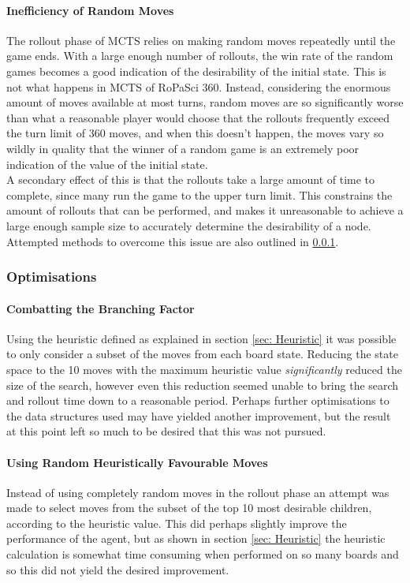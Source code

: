 \documentclass{article}
\begin{document}
\paragraph{Inefficiency of Random Moves}
The rollout phase of MCTS relies on making random moves repeatedly until the game ends. With a large enough number of rollouts, the win rate of the random games becomes a good indication of the desirability of the initial state. This is not what happens in MCTS of RoPaSci 360. Instead, considering the enormous amount of moves available at most turns, random moves are so significantly worse than what a reasonable player would choose that the rollouts frequently exceed the turn limit of 360 moves, and when this doesn't happen, the moves vary so wildly in quality that the winner of a random game is an extremely poor indication of the value of the initial state.\\[2mm]
A secondary effect of this is that the rollouts take a large amount of time to complete, since many run the game to the upper turn limit. This constrains the amount of rollouts that can be performed, and makes it unreasonable to achieve a large enough sample size to accurately determine the desirability of a node. Attempted methods to overcome this issue are also outlined in \ref{sec: MCTS Optimisations}.

\subsubsection{Optimisations}
\label{sec: MCTS Optimisations}
\paragraph{Combatting the Branching Factor}
Using the heuristic defined as explained in section \ref{sec: Heuristic} it was possible to only consider a subset of the moves from each board state. Reducing the state space to the 10 moves with the maximum heuristic value \textit{significantly} reduced the size of the search, however even this reduction seemed unable to bring the search and rollout time down to a reasonable period. Perhaps further optimisations to the data structures used may have yielded another improvement, but the result at this point left so much to be desired that this was not pursued.
\paragraph{Using Random Heuristically Favourable Moves}
Instead of using completely random moves in the rollout phase an attempt was made to select moves from the subset of the top 10 most desirable children, according to the heuristic value. This did perhaps slightly improve the performance of the agent, but as shown in section \ref{sec: Heuristic} the heuristic calculation is somewhat time consuming when performed on so many boards and so this did not yield the desired improvement.
\end{document}
